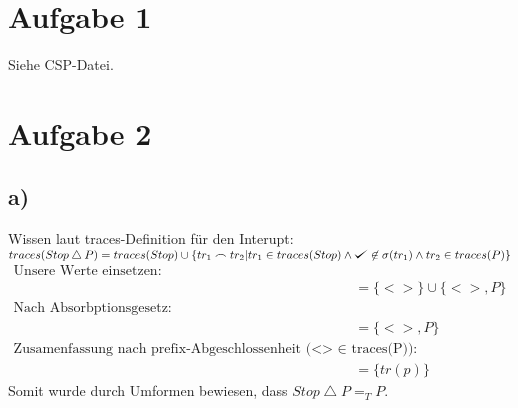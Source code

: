 \documentclass[10pt,a4paper,fleqn]{article}
\def\checkmark{\tikz\fill[scale=0.4](0,.35) -- (.25,0) -- (1,.7) -- (.25,.15) -- cycle;}
\begin{document}
  \renewcommand{\labelenumi}{(\alph{enumi})}
  \renewcommand\headrule{\vspace{+2pt}\hrule}
  \newcommand{\solved}{\[\hfill\Box\]}
  \setlength{\headheight}{2.5\baselineskip}
  \pagestyle{fancyplain}

  \rhead{\emph{}\\ \today}
  \section*{Aufgabe 1}
  Siehe CSP-Datei.

  \section*{Aufgabe 2}
  \subsection*{a)}
  Wissen laut traces-Definition für den Interupt:\\
  $traces(Stop \bigtriangleup P) = traces(Stop) \cup \{tr_1 \frown tr_2 | tr_1 \in traces(Stop) \wedge \checkmark \not\in \sigma(tr_1) \wedge tr_2 \in traces(P) \}$
\begin{align*}
\text{Unsere Werte einsetzen:}\\
&= \{<>\}\cup\{<>, P\}\\
\text{Nach Absorbptionsgesetz:}\\
&= \{<>, P\}\\
\text{Zusamenfassung nach prefix-Abgeschlossenheit (<> $\in$ traces(P)): }\\
&=\{tr(p)\}
\end{align*}
Somit wurde durch Umformen bewiesen, dass $Stop \bigtriangleup P =_T P$.
\end{document}
